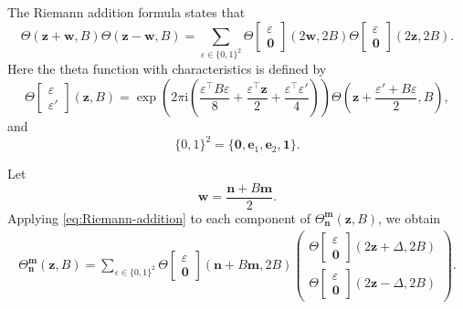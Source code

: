 \documentclass{amsart}
\numberwithin{equation}{hw}
\begin{document}
The Riemann addition formula states that
\begin{equation}
\Theta(\bm{z}+\bm{w},B)
\Theta(\bm{z}-\bm{w},B)
=
\sum_{\varepsilon\in\{0,1\}^2}
\Theta\!\begin{bmatrix}
\varepsilon\\
\bm{0}
\end{bmatrix}
(2\bm{w},2B)
\Theta\!\begin{bmatrix}
\varepsilon\\
\bm{0}
\end{bmatrix}
(2\bm{z},2B).
\label{eq:Riemann-addition}
\end{equation}
Here the theta function with characteristics is defined by
\begin{equation}
\Theta\!\begin{bmatrix}
\varepsilon\\
\varepsilon'
\end{bmatrix}
(\bm{z},B)
=
\exp\!\left(
2\pi\mathrm{i}
\left(
\frac{\varepsilon^{\top}B\varepsilon}{8}
+
\frac{\varepsilon^{\top}\bm{z}}{2}
+
\frac{\varepsilon^{\top}\varepsilon'}{4}
\right)
\right)
\Theta\!\left(
\bm{z}
+
\frac{\varepsilon'+B\varepsilon}{2},
B
\right),
\label{eq:theta-characteristic}
\end{equation}
and
\begin{equation}
\{0,1\}^2
=
\{
\bm{0},
\bm{e}_1,
\bm{e}_2,
\bm{1}
\}.
\label{eq:binary-vectors}
\end{equation}

Let
\begin{equation}
\bm{w}
=
\frac{\bm{n}+B\bm{m}}{2}.
\label{eq:W-definition}
\end{equation}
Applying \eqref{eq:Riemann-addition} to each component of
\(\Theta_{\bm{n}}^{\bm{m}}(\bm{z},B)\), we obtain
\begin{align}
\Theta_{\bm{n}}^{\bm{m}}(\bm{z},B)
=
\sum_{\varepsilon\in\{0,1\}^{2}}
\Theta\!\begin{bmatrix}
\varepsilon\\
\bm{0}
\end{bmatrix}
(\bm{n}+B\bm{m},2B)
\begin{pmatrix}
\Theta\!\begin{bmatrix}
\varepsilon\\
\bm{0}
\end{bmatrix}
(2\bm{z}+\Delta,2B)
\\[10pt]
\Theta\!\begin{bmatrix}
\varepsilon\\
\bm{0}
\end{bmatrix}
(2\bm{z}-\Delta,2B)
\end{pmatrix}.
\label{eq:ThetaNm-expansion}
\end{align}
\end{document}
